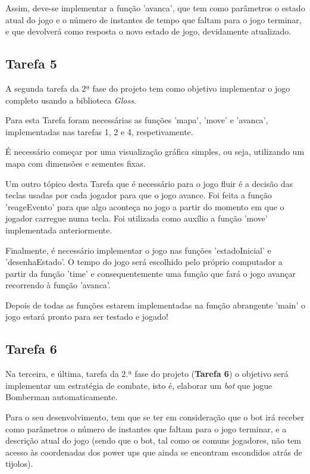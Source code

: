 \documentclass[a4paper]{article}
\begin{document}
Assim, deve-se implementar a função \textsf{'avanca'}, que tem como parâmetros o estado atual
do jogo e o número de instantes de tempo que faltam para o jogo terminar, e que devolverá
como resposta o novo estado de jogo, devidamente atualizado.

\subsection{Tarefa 5}
\label{sec:problemaTarefa5}

A segunda tarefa da 2ª fase do projeto tem como objetivo implementar o jogo completo usando a biblioteca \emph{Gloss}.

Para esta Tarefa foram necessárias as funções \textsf{'mapa'}, \textsf{'move'} e \textsf{'avanca'}, implementadas nas 
tarefas 1, 2 e 4, respetivamente.

É necessário começar por uma visualização gráfica simples, ou seja, utilizando um mapa com dimensões e sementes fixas. 

Um outro tópico desta Tarefa que é necessário para o jogo fluir é a decisão das teclas usadas por cada jogador 
para que o jogo avance. Foi feita a função \textsf{'reageEvento'} para que algo aconteça no jogo a partir do 
momento em que o jogador carregue numa tecla. Foi utilizada como auxílio a função \textsf{'move'} implementada 
anteriormente.

Finalmente, é necessário implementar o jogo nas funções \textsf{'estadoInicial'} e \textsf{'desenhaEstado'}.
O tempo do jogo será escolhido pelo próprio computador a partir da função \textsf{'time'} e consequentemente uma função
que fará o jogo avançar recorrendo à função \textsf{'avanca'}.

Depois de todas as funções estarem implementadas na função abrangente \textsf{'main'} o jogo estará pronto 
para ser testado e jogado!

\subsection{Tarefa 6}
\label{sec:problemaTarefa6}

Na terceira, e última, tarefa da 2.ª fase do projeto (\textbf{Tarefa 6}) o objetivo
será implementar um estratégia de combate, isto é, elaborar um \emph{bot} que jogue 
Bomberman automaticamente. 

Para o seu desenvolvimento, tem que se ter em consideração que o bot irá receber 
como parâmetros o número de instantes que faltam para o jogo terminar, e a descrição 
atual do jogo (sendo que o bot, tal como os comuns jogadores, não tem acesso às coordenadas 
dos power ups que ainda se encontram escondidos atrás de tijolos).
\end{document}
